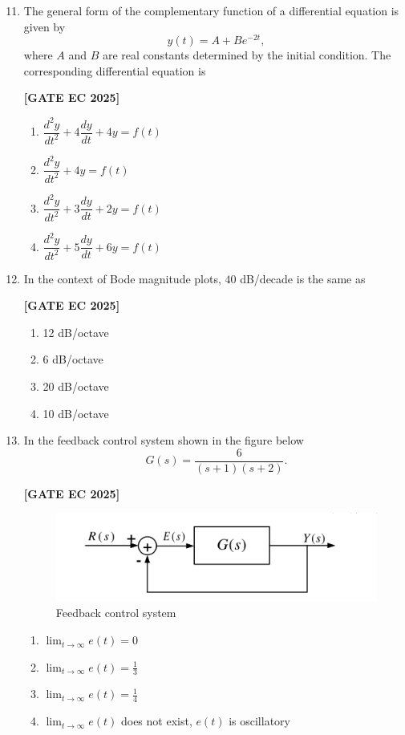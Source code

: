 \documentclass[12pt]{article}
\begin{document}
\begin{enumerate}[leftmargin=1.5em, label=\textbf{Q.\arabic*}., itemsep=2em]
\setcounter{enumi}{10}

\item The general form of the complementary function of a differential equation is given by
\[
y(t) = A + B e^{-2t},
\]
where $A$ and $B$ are real constants determined by the initial condition. The corresponding differential equation is

\noindent \textbf{[GATE EC 2025]}
\begin{multicols}{2}
\begin{enumerate}
    \item $\dfrac{d^2y}{dt^2} + 4 \dfrac{dy}{dt} + 4y = f(t)$
    \item $\dfrac{d^2y}{dt^2} + 4y = f(t)$
    \item $\dfrac{d^2y}{dt^2} + 3 \dfrac{dy}{dt} + 2y = f(t)$
    \item $\dfrac{d^2y}{dt^2} + 5 \dfrac{dy}{dt} + 6y = f(t)$
\end{enumerate}
\end{multicols}

\item In the context of Bode magnitude plots, $40$ dB/decade is the same as

\noindent \textbf{[GATE EC 2025]}
\begin{multicols}{2}
\begin{enumerate}
    \item 12 dB/octave
    \item 6 dB/octave
    \item 20 dB/octave
    \item 10 dB/octave
\end{enumerate}
\end{multicols}

\item In the feedback control system shown in the figure below
\[
G(s) = \frac{6}{(s+1)(s+2)}.
\]

\noindent \textbf{[GATE EC 2025]}
\begin{figure}[H]\centering
\includegraphics[width=0.6\columnwidth]{figs/q13.png}
\caption{Feedback control system}
\label{fig:q13}
\end{figure}
\begin{multicols}{2}
\begin{enumerate}
    \item $\lim_{t \to \infty} e(t) = 0$
    \item $\lim_{t \to \infty} e(t) = \tfrac{1}{3}$
    \item $\lim_{t \to \infty} e(t) = \tfrac{1}{4}$
    \item $\lim_{t \to \infty} e(t)$ does not exist, $e(t)$ is oscillatory
\end{enumerate}
\end{multicols}


\end{enumerate}
\end{document}
